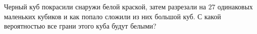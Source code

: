 \documentclass{article}
\begin{document}
Черный куб покрасили снаружи белой краской, затем разрезали на $27$ одинаковых
маленьких кубиков и как попало сложили из них большой куб. С какой вероятностью все грани этого куба будут белыми?
\end{document}
